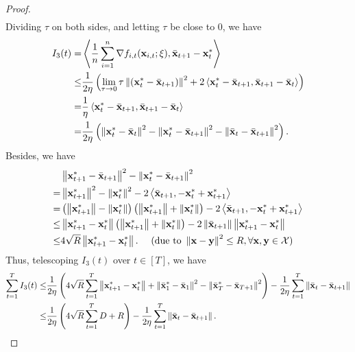 \documentclass{article}
\begin{document}
\begin{proof}
\begin{align}
\end{align} Dividing $\tau$ on both sides, and letting $\tau$ be close to $0$, we have
\begin{align}
\nonumber
I_3(t) = & \left\langle\frac{1}{n}\sum_{i=1}^n \nabla f_{i,t}({\bf x}_{i,t};\xi), \bar{{\bf x}}_{t+1} - {\bf x}_t^\ast \right\rangle \\ \nonumber 
\le & \frac{1}{2\eta}\left(  \lim_{\tau \rightarrow 0}\tau \left\lVert\left( {\bf x}_t^\ast - \bar{{\bf x}}_{t+1} \right)\right\rVert^2 + 2\left\langle {\bf x}_t^\ast - \bar{{\bf x}}_{t+1}, \bar{{\bf x}}_{t+1} - \bar{{\bf x}}_t  \right\rangle  \right) \\ \nonumber
= & \frac{1}{\eta}\left\langle {\bf x}_t^\ast - \bar{{\bf x}}_{t+1}, \bar{{\bf x}}_{t+1} - \bar{{\bf x}}_t  \right\rangle \\ \label{equa_I3_temp}
= & \frac{1}{2\eta}\left(  \left\lVert{\bf x}_t^\ast - \bar{{\bf x}}_t\right\rVert^2 - \left\lVert{\bf x}_t^\ast - \bar{{\bf x}}_{t+1}\right\rVert^2 - \left\lVert\bar{{\bf x}}_t - \bar{{\bf x}}_{t+1}\right\rVert^2  \right). 
\end{align} Besides, we have
\begin{align}
\nonumber
& \left\lVert{\bf x}_{t+1}^\ast - \bar{{\bf x}}_{t+1}\right\rVert^2 - \left\lVert{\bf x}_t^\ast - \bar{{\bf x}}_{t+1}\right\rVert^2 \\ \nonumber 
= & \left\lVert{\bf x}_{t+1}^\ast\right\rVert^2 - \left\lVert{\bf x}_t^\ast\right\rVert^2 - 2\left\langle\bar{{\bf x}}_{t+1}, -{\bf x}_t^\ast + {\bf x}_{t+1}^\ast \right\rangle \\ \nonumber
= & \left( \left\lVert{\bf x}_{t+1}^\ast\right\rVert - \left\lVert{\bf x}_t^\ast\right\rVert \right) \left( \left\lVert{\bf x}_{t+1}^\ast\right\rVert + \left\lVert{\bf x}_t^\ast\right\rVert \right) - 2\left\langle\bar{{\bf x}}_{t+1}, -{\bf x}_t^\ast + {\bf x}_{t+1}^\ast \right\rangle \\ \nonumber
\le & \left\lVert{\bf x}_{t+1}^\ast - {\bf x}_t^\ast\right\rVert \left( \left\lVert{\bf x}_{t+1}^\ast\right\rVert + \left\lVert{\bf x}_t^\ast\right\rVert \right) - 2\left\lVert\bar{{\bf x}}_{t+1}\right\rVert \left\lVert{\bf x}_{t+1}^\ast-{\bf x}_t^\ast\right\rVert \\ \nonumber
\le & 4\sqrt{R}\left\lVert{\bf x}_{t+1}^\ast - {\bf x}_t^\ast\right\rVert.    ~~~~(\text{due to } \left\lVert{\bf x} - {\bf y}\right\rVert^2 \le R, \forall {\bf x}, {\bf y}\in{\mathcal{X}}) 
\end{align} Thus, telescoping $I_3(t)$ over $t\in[T]$, we have 
\begin{align}
\nonumber
\sum_{t=1}^T I_3(t) \le & \frac{1}{2\eta}\left(  4\sqrt{R}\sum_{t=1}^T\left\lVert{\bf x}_{t+1}^\ast - {\bf x}_t^\ast\right\rVert + \left\lVert\bar{{\bf x}}_1^\ast - \bar{{\bf x}}_1\right\rVert^2 - \left\lVert\bar{{\bf x}}_T^\ast - \bar{{\bf x}}_{T+1}\right\rVert^2  \right) - \frac{1}{2\eta} \sum_{t=1}^T \left\lVert\bar{{\bf x}}_t - \bar{{\bf x}}_{t+1}\right\rVert \\ \nonumber
\le & \frac{1}{2\eta}\left(  4\sqrt{R}\sum_{t=1}^T D + R  \right) - \frac{1}{2\eta} \sum_{t=1}^T \left\lVert\bar{{\bf x}}_t - \bar{{\bf x}}_{t+1} \right\rVert.
\end{align} 



\end{proof}
\end{document}
